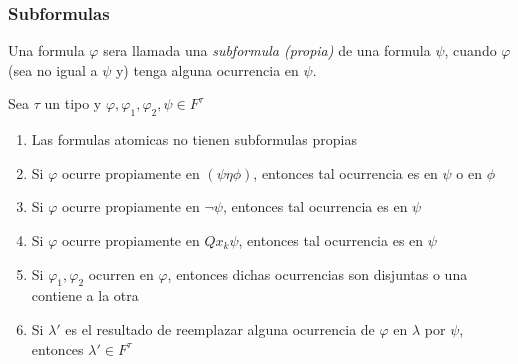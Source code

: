 \subsubsection{Subformulas}
\begin{definition}
  Una formula $\varphi$ sera llamada una \emph{subformula (propia)} de una formula $\psi$, cuando $\varphi$ (sea no igual a $\psi$ y)
  tenga alguna ocurrencia en $\psi$.
\end{definition}
\begin{lemma}
  Sea $\tau$ un tipo y $\varphi,\varphi_1,\varphi_2,\psi \in F^\tau$
  \begin{enumerate}
    \item Las formulas atomicas no tienen subformulas propias
    \item Si $\varphi$ ocurre propiamente en $(\psi\eta\phi)$, entonces tal ocurrencia es en $\psi$ o en $\phi$
    \item Si $\varphi$ ocurre propiamente en $\neg\psi$, entonces tal ocurrencia es en $\psi$
    \item Si $\varphi$ ocurre propiamente en $Qx_k\psi$, entonces tal ocurrencia es en $\psi$
    \item Si $\varphi_1, \varphi_2$ ocurren en $\varphi$, entonces dichas ocurrencias son disjuntas o una contiene a la otra
    \item Si $\lambda'$ es el resultado de reemplazar alguna ocurrencia de $\varphi$ en $\lambda$ por $\psi$, entonces $\lambda' \in F^\tau$
  \end{enumerate}
\end{lemma}
\noproof
